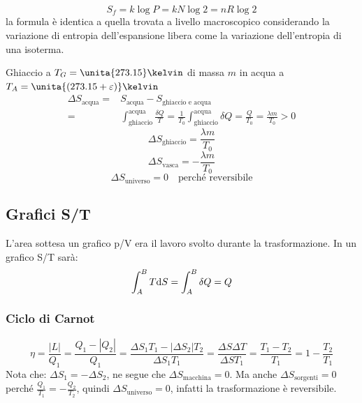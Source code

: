 \begin{equation*}S_f=k\log P=kN\log 2=nR\log 2\end{equation*}
la formula è identica a quella trovata a livello macroscopico considerando la variazione di entropia dell'espansione libera come la variazione dell'entropia di una isoterma.

\begin{Es}
Ghiaccio a $T_G=\unita{273.15}\kelvin$ di massa $m$ in acqua a $T_A=\unita{(273.15+\varepsilon)}\kelvin$
\begin{align*}
\Delta S_\text{acqua}=&S_\text{acqua}-S_\text{ghiaccio e acqua}\\
=&\int_\text{ghiaccio}^\text{acqua}\frac{\delta Q}{T}=\frac{1}{T_0}\int_\text{ghiaccio}^\text{acqua}\delta Q=\frac{Q}{T_0}=\frac{\lambda m}{T_0}>0
\end{align*}
\begin{equation*}\Delta S_\text{ghiaccio}=\frac{\lambda m}{T_0}\end{equation*}
\begin{equation*}\Delta S_\text{vasca}=-\frac{\lambda m}{T_0}\end{equation*}
\begin{equation*}\Delta S_\text{universo}=0\quad\text{perché reversibile}\end{equation*}
\end{Es}
\subsection{Grafici S/T}
L'area sottesa un grafico p/V era il lavoro svolto durante la trasformazione. In un grafico S/T sarà:
\begin{equation*}\int_A^B T\mathrm{d} S=\int_A^B\delta Q=Q\end{equation*}
\subsubsection{Ciclo di Carnot}
\begin{equation*}\eta=\frac{|L|}{Q_1}=\frac{Q_1-|Q_2|}{Q_1}=\frac{\Delta S_1T_1-|\Delta S_2| T_2}{\Delta S_1 T_1}=\frac{\Delta S\Delta T}{\Delta S T_1}=\frac{T_1-T_2}{T_1}=1-\frac{T_2}{T_1}\end{equation*}
Nota che: $\Delta S_1=-\Delta S_2$, ne segue che $\Delta S_\text{macchina}=0$. Ma anche \mbox{$\Delta S_\text{sorgenti}=0$} perché $\frac{Q_1}{T_1}=-\frac{Q_2}{T_2}$, quindi $\Delta S_\text{universo}=0$, infatti la trasformazione è reversibile.

